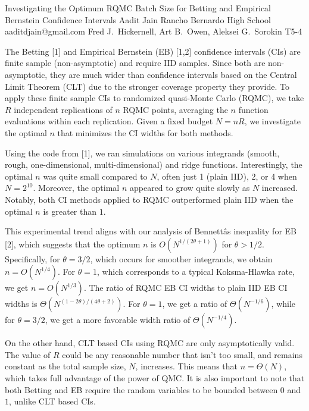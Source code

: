 \begin{talk}
  {Investigating the Optimum RQMC Batch Size for Betting and Empirical Bernstein Confidence Intervals}%
  {Aadit Jain}%
  {Rancho Bernardo High School}%
  {aaditdjain@gmail.com}%
  {Fred J.\ Hickernell, Art B.\ Owen, Aleksei G.\ Sorokin}%
  {T5-4}%
			

The Betting [1] and Empirical Bernstein (EB) [1,2] confidence intervals (CIs) are finite sample (non-asymptotic) and require IID samples. Since both are non-asymptotic, they are much wider than confidence intervals based on the Central Limit Theorem (CLT) due to the stronger coverage property they provide. To apply these finite sample CIs to randomized quasi-Monte Carlo (RQMC), we take $R$ independent replications of $n$ RQMC points, averaging the $n$ function evaluations within each replication. Given a fixed budget $N = nR$, we investigate the optimal $n$ that minimizes the CI widths for both methods.  

Using the code from [1], we ran simulations on various integrands (smooth, rough, one-dimensional, multi-dimensional) and ridge functions. Interestingly, the optimal $n$ was quite small compared to $N$, often just 1 (plain IID), 2, or 4 when $N = 2^{10}$. Moreover, the optimal $n$ appeared to grow quite slowly as $N$ increased. Notably, both CI methods applied to RQMC outperformed plain IID when the optimal $n$ is greater than $1$.  

This experimental trend aligns with our analysis of Bennettâs inequality for EB [2], which suggests that the optimum $n$ is $O(N^{1/(2\theta + 1)})$ for $\theta > 1/2$. 
Specifically, for $\theta = 3/2$, which occurs for smoother integrands, we obtain $n = O(N^{1/4})$. For $\theta = 1$, which corresponds to a typical Koksma-Hlawka rate, we get $n = O(N^{1/3})$. The ratio of RQMC EB CI widths to plain IID EB CI widths is $\Theta( N^{(1-2\theta)/(4\theta+2)})$. For $\theta=1$,
we get a ratio of $\Theta(N^{-1/6})$,
while for $\theta=3/2$,
we get a more favorable width ratio of $\Theta(N^{-1/4})$. 


On the other hand, CLT based CIs using RQMC  are only asymptotically valid. The value of $R$ could be any reasonable number that isn't too small, and remains constant as the total sample size, $N$, increases.  This means that $n = \Theta(N)$, which takes full advantage of the power of QMC.  It is also important to note that both Betting and EB require the random variables to be bounded between $0$ and $1$, unlike CLT based CIs. 



\end{talk}
